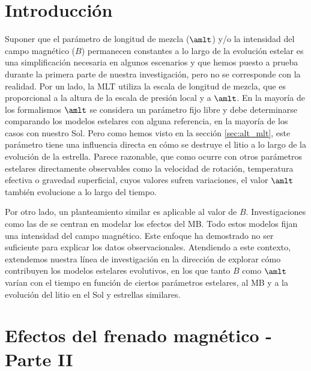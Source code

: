 
\section{Introducción}
Suponer que el parámetro de longitud de mezcla ($\amlt$) y/o la intensidad del campo magnético ($B$) permanecen constantes a lo largo de la evolución estelar es una simplificación necesaria en algunos escenarios y que hemos puesto a prueba durante la primera parte de nuestra investigación, pero no se corresponde con la realidad. Por un lado,  la MLT utiliza la escala de longitud de mezcla, que es proporcional a la altura de la escala de presión local y a $\amlt$. En la mayoría de los formalismos $\amlt$ se considera un parámetro fijo libre y debe determinarse comparando los modelos estelares con alguna referencia, en la mayoría de los casos con nuestro Sol. Pero como hemos visto en la sección \ref{sec:alt_mlt}, este parámetro tiene una influencia directa en cómo se destruye el litio a lo largo de la evolución de la estrella. Parece razonable, que como ocurre con otros parámetros estelares directamente observables como la velocidad de rotación, temperatura efectiva o gravedad superficial, cuyos valores sufren variaciones, el valor $\amlt$ también evolucione a lo largo del tiempo.\par

Por otro lado, un planteamiento similar es aplicable al valor de $B$. Investigaciones como las de \citet{Ud-Doula2008, Cranmer2011, Gallet2015, Amard2016} se centran en modelar los efectos del MB. Todo estos modelos fijan una intensidad del campo magnético. Este enfoque ha demostrado no ser suficiente para explicar los datos observacionales. Atendiendo a este contexto, extendemos nuestra línea de investigación en la dirección de explorar cómo contribuyen los modelos estelares evolutivos, en los que tanto $B$ como $\amlt$ varían con el tiempo en función de ciertos parámetros estelares, al MB y a la evolución del litio en el Sol y estrellas similares.\par


\section{Efectos del frenado magnético - Parte II}





